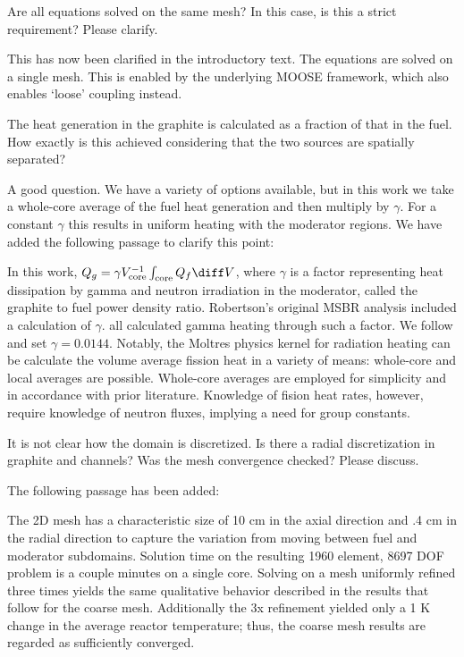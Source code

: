 \documentclass[answers,11pt]{exam}
\begin{document}
\begin{questions}
\question Are all equations solved on the same mesh? In this case, is this a strict requirement? Please clarify.
\begin{solution}
        This has now been clarified in the introductory text. The equations are
        solved on a single mesh. This is enabled by the underlying MOOSE
        framework, which also enables `loose' coupling instead.
\end{solution}

\question The heat generation in the graphite is calculated as a fraction of
that in the fuel. How exactly is this achieved considering that the two sources
are spatially separated?
\begin{solution}
        A good question. We have a variety of options available, but in this
        work we take a whole-core average of the fuel heat generation and then
        multiply by $\gamma$. For a constant $\gamma$ this results in uniform
        heating with the moderator regions. We have added the following passage
        to clarify this point:

        In this work, $Q_g = \gamma V_{\text{core}}^{-1} \int_{\text{core}}Q_f
        \diff V$, where $\gamma$ is a factor representing heat dissipation by
        gamma and neutron irradiation in the moderator, called the graphite to
        fuel power density ratio. Robertson's \cite{robertson_conceptual_1971}
        original \gls{MSBR} analysis included a calculation of $\gamma$.
        \cite{krepel_dyn3d-msr_2007,zhang_development_2009,cammi_multi-physics_2011}
        all calculated gamma heating through such a factor. We follow
        \cite{cammi_multi-physics_2011} and set $\gamma=0.0144$. Notably, the
        Moltres physics kernel for radiation heating can be calculate the volume
        average fission heat in a variety of means: whole-core and local
        averages are possible. Whole-core averages are employed for simplicity
        and in accordance with prior literature.  Knowledge of fision heat
        rates, however, require knowledge of neutron fluxes, implying a need for
        group constants.
\end{solution}

\question It is not clear how the domain is discretized. Is there a radial
discretization in graphite and channels? Was the mesh convergence checked?
Please discuss.
\begin{solution}
       The following passage has been added:

       The 2D mesh has a characteristic size of 10 cm in the axial
       direction and .4 cm in the radial direction to capture the variation from moving
       between fuel and moderator subdomains. Solution time on the resulting 1960
       element, 8697 DOF problem is a couple minutes on a single core. Solving on a
       mesh uniformly refined three times yields the same qualitative behavior
       described in the results that follow for the coarse mesh. Additionally the 3x
       refinement yielded only a 1 K change in the average reactor temperature; thus,
       the coarse mesh results are regarded as sufficiently converged.
\end{solution}


\end{questions}
\end{document}

